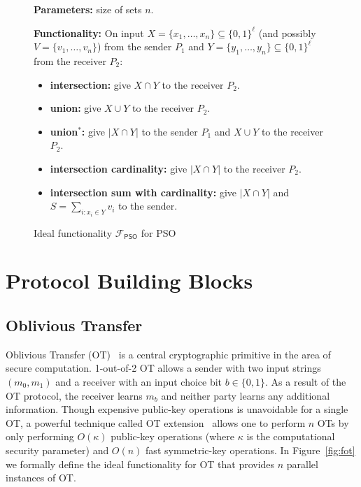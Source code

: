 \documentclass[a4paper,10pt]{article}
\newcommand{\FuncPSO}{\mathcal{F}_\mathsf{PSO}}
\begin{document}
\begin{figure}[!hbtp]
\begin{framed}
\begin{minipage}[center]{\textwidth}
\begin{trivlist}
\item \textbf{Parameters:} size of sets $n$.

\item \textbf{Functionality:}
On input $X = \{x_1, \dots, x_n\} \subseteq \{0,1\}^\ell$ (and possibly $V = \{v_1, \dots, v_n\}$) 
from the sender $P_1$ and $Y = \{y_1, \dots, y_n\} \subseteq \{0,1\}^\ell$ from the receiver $P_2$: 
\begin{itemize}
\item \textbf{intersection:} give $X \cap Y$ to the receiver $P_2$.
\item \textbf{union:} give $X \cup Y$ to the receiver $P_2$.
\item \textbf{union$^*$:} give $|X \cap Y|$ to the sender $P_1$ and $X \cup Y$ to the receiver $P_2$.
\item \textbf{intersection cardinality:} give $|X \cap Y|$ to the receiver $P_2$.  
\item \textbf{intersection sum with cardinality:} give $|X \cap Y|$ and $S = \sum_{i: x_i \in Y} v_i$ to the sender. 
\end{itemize}
\end{trivlist}
\end{minipage}
\end{framed}
\caption{Ideal functionality $\FuncPSO$ for PSO}\label{fig:fpso}
\end{figure}

\section{Protocol Building Blocks}

\subsection{Oblivious Transfer}
Oblivious Transfer (OT)~\cite{Rabin-ePrint-2005} is a central cryptographic primitive in the area of secure computation. 
1-out-of-2 OT allows a sender with two input strings $(m_0, m_1)$ and a receiver with an input choice bit $b \in \{0,1\}$. 
As a result of the OT protocol, the receiver learns $m_b$ and neither party learns any additional information. 
Though expensive public-key operations is unavoidable for a single OT,  
a powerful technique called OT extension~\cite{IKNP-CRYPTO-2003, KK-CRYPTO-2013, ALSZ-EUROCRYPT-2015} 
allows one to perform $n$ OTs by only performing $O(\kappa)$ 
public-key operations (where $\kappa$ is the computational security parameter) and $O(n)$ fast symmetric-key operations. 
In Figure~\ref{fig:fot} we formally define the ideal functionality for OT that provides $n$ parallel instances of OT. 
\end{document}
